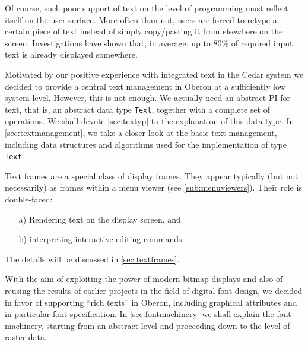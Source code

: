 Of course,
such poor support of text on the level of programming must reflect itself on the user surface.
More often than not, users are forced to retype a certain piece of text
instead of simply copy/pasting it from elsewhere on the screen.
Investigations have shown that, in average,
up to 80\% of required input text is already displayed somewhere.

Motivated by our positive experience with integrated text in the Cedar system \cite{Teitelman}
we decided to provide a central text management in Oberon at a sufficiently low system level.
However, this is not enough.  We actually need an abstract PI for text, that is,
an abstract data type \verb|Text|, together with a complete set of operations.
We shall devote \ref{sec:textyp} to the explanation of this data type.
In \ref{sec:textmanagement}, we take a closer look at the basic text management,
including data structures and algorithms used for the implementation of type \verb|Text|.

Text frames are a special class of display frames.  They appear typically (but not necessarily)
as frames within a menu viewer (see \ref{sub:menuviewers}).  Their role is double-faced:
\begin{itemize}
  \item[a)] Rendering text on the display screen, and
  \item[b)] interpreting interactive editing commands.
\end{itemize}
The details will be discussed in \ref{sec:textframes}.

With the aim of exploiting the power of modern bitmap-displays
and also of reusing the results of earlier projects in the field of digital font design,
we decided in favor of supporting “rich texts” in Oberon, including graphical attributes
and in particular font specification.  In \ref{sec:fontmachinery} we shall explain the font machinery,
starting from an abstract level and proceeding down to the level of raster data.

